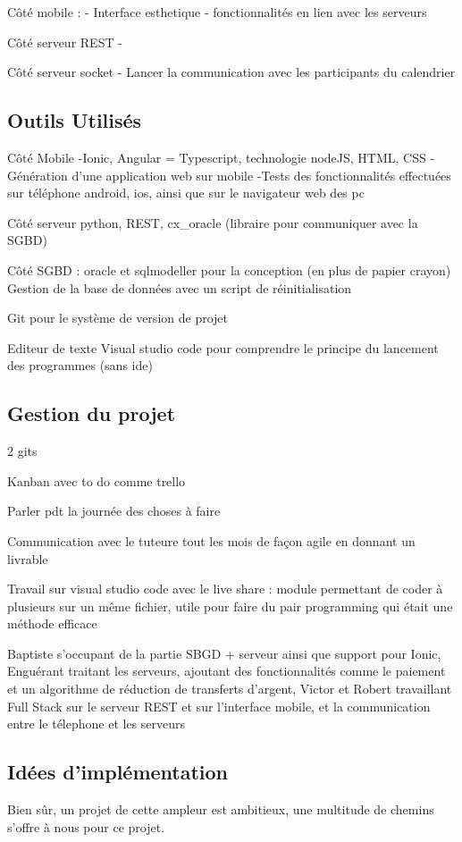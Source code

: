 Côté mobile :
- Interface esthetique
- fonctionnalités en lien avec les serveurs

Côté serveur REST
- 

Côté serveur socket
- Lancer la communication avec les participants du calendrier


\subsection{Outils Utilisés}
Côté Mobile
-Ionic, Angular = Typescript, technologie nodeJS, HTML, CSS
-Génération d'une application web sur mobile
-Tests des fonctionnalités effectuées sur téléphone android, ios, ainsi que sur le navigateur web des pc

Côté serveur
python, REST, cx\_oracle (libraire pour communiquer avec la SGBD)

Côté SGBD : oracle et sqlmodeller pour la conception (en plus de papier crayon)
Gestion de la base de données avec un script de réinitialisation

Git pour le système de version de projet

Editeur de texte Visual studio code pour comprendre le principe du lancement des programmes (sans ide)

\subsection{Gestion du projet}
2 gits

Kanban avec to do comme trello

Parler pdt la journée des choses à faire

Communication avec le tuteure tout les mois de façon agile en donnant un livrable

Travail sur visual studio code avec le live share : module permettant de coder à plusieurs sur un même fichier, utile pour faire du pair programming qui était une méthode efficace

Baptiste s'occupant de la partie SBGD + serveur ainsi que support pour Ionic,
Enguérant traitant les serveurs, ajoutant des fonctionnalités comme le paiement et un algorithme de réduction de transferts d'argent,
Victor et Robert travaillant Full Stack sur le serveur REST et sur l'interface mobile, et la communication entre le télephone et les serveurs


\subsection{Idées d'implémentation}

Bien sûr, un projet de cette ampleur est ambitieux, une multitude de chemins s'offre à nous pour ce projet.